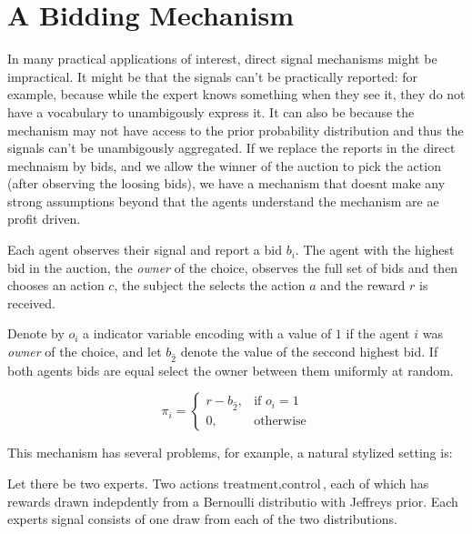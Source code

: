\section{A Bidding Mechanism}

In many practical applications of interest, direct signal mechanisms might be impractical. It might be that the signals can't be practically reported: for example, because while the expert knows something when they see it, they do not have a vocabulary to unambigously express it. It can also be because the mechanism may not have access to the prior  probability distribution and thus the signals can't be unambigously aggregated. 
If we replace the reports in the direct mechnaism by bids, and we allow the winner of the auction to pick the action (after observing the loosing bids), we have a mechanism that doesnt make any strong assumptions beyond that the agents understand the mechanism are ae profit driven.



\begin{mech}

Each agent observes their signal and report a bid $b_i$.
The agent with the highest bid in the auction, the \emph{owner} of the choice, observes the full set of bids and then chooses an action $c$, the subject the selects the action $a$ and the reward $r$ is received. 

Denote by $o_{i}$ a indicator variable encoding with a value of $1$ if the agent $i$ was  \emph{owner} of the choice, and let $b_{\hat{2}}$ denote the value of the seccond highest  bid. If both agents bids are equal  select the owner between them uniformly at random.

\[
    \pi_i =  
\begin{cases}
        r - b_{\hat{2}} ,& \text{if } o_{i} = 1 \\
		0,              & \text{otherwise}
\end{cases}
\]
\end{mech}


This mechanism has several problems, for example, a natural stylized setting is:


\begin{eg}\label{eg:two-iid-signals}
	Let there be two experts. Two actions ${\text{treatment},\text{control}}$, each of which has rewards drawn indepdently from a Bernoulli distributio with Jeffreys prior. Each experts signal consists of one draw from each of the two distributions.
\end{eg}

